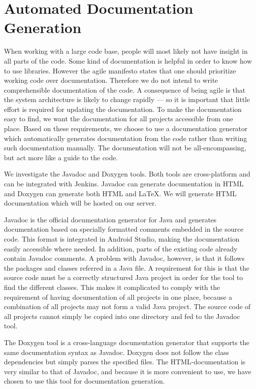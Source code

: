 \section{Automated Documentation Generation}\label{sec:automated_documentation_gen}
When working with a large code base, people will most likely not have insight in all parts of the code. Some kind of documentation is helpful in order to know how to use libraries. However the agile manifesto states that one should prioritize working code over documentation\parencite{agile-manifesto-web}. Therefore we do not intend to write comprehensible documentation of the code. A consequence of being agile is that the system architecture is likely to change rapidly --- so it is important that little effort is required for updating the documentation. To make the documentation easy to find, we want the documentation for all projects accessible from one place. Based on these requirements, we choose to use a documentation generator which automatically generates documentation from the code rather than writing such documentation manually. The documentation will not be all-encompassing, but act more like a guide to the code.

We investigate the Javadoc \parencite{javadoc} and Doxygen \parencite{doxygen} tools. Both tools are cross-platform and can be integrated with Jenkins. Javadoc can generate documentation in HTML and Doxygen can generate both HTML and \LaTeX. We will generate HTML documentation which will be hosted on our server.

Javadoc is the official documentation generator for Java and generates documentation based on specially formatted comments embedded in the source code. This format is integrated in Android Studio, making the documentation easily accessible where needed. In addition, parts of the existing code already contain Javadoc comments. A problem with Javadoc, however, is that it follows the packages and classes referred in a Java file. A requirement for this is that the source code must be a correctly structured Java project in order for the tool to find the different classes. This makes it complicated to comply with the requirement of having documentation of all projects in one place, because a combination of all projects may not form a valid Java project. The source code of all projects cannot simply be copied into one directory and fed to the Javadoc tool.

The Doxygen tool is a cross-language documentation generator that supports the same documentation syntax as Javadoc. Doxygen does not follow the class dependencies but simply parses the specified files. The HTML-documentation is very similar to that of Javadoc, and because it is more convenient to use, we have chosen to use this tool for documentation generation.

